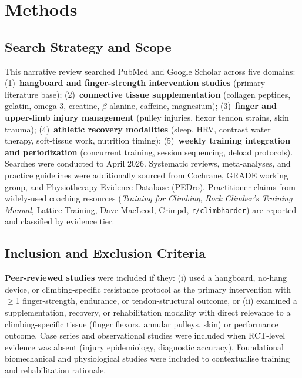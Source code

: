 \section{Methods}

\subsection*{Search Strategy and Scope}

This narrative review searched PubMed and Google Scholar across five domains: (1)~\textbf{hangboard and finger-strength intervention studies} (primary literature base); (2)~\textbf{connective tissue supplementation} (collagen peptides, gelatin, omega-3, creatine, $\beta$-alanine, caffeine, magnesium); (3)~\textbf{finger and upper-limb injury management} (pulley injuries, flexor tendon strains, skin trauma); (4)~\textbf{athletic recovery modalities} (sleep, HRV, contrast water therapy, soft-tissue work, nutrition timing); (5)~\textbf{weekly training integration and periodization} (concurrent training, session sequencing, deload protocols). Searches were conducted to April 2026. Systematic reviews, meta-analyses, and practice guidelines were additionally sourced from Cochrane, GRADE working group, and Physiotherapy Evidence Database (PEDro). Practitioner claims from widely-used coaching resources (\textit{Training for Climbing}, \textit{Rock Climber's Training Manual}, Lattice Training, Dave MacLeod, Crimpd, \texttt{r/climbharder}) are reported and classified by evidence tier.

\subsection*{Inclusion and Exclusion Criteria}

\textbf{Peer-reviewed studies} were included if they: (i) used a hangboard, no-hang device, or climbing-specific resistance protocol as the primary intervention with $\geq$1 finger-strength, endurance, or tendon-structural outcome, or (ii) examined a supplementation, recovery, or rehabilitation modality with direct relevance to a climbing-specific tissue (finger flexors, annular pulleys, skin) or performance outcome. Case series and observational studies were included when RCT-level evidence was absent (injury epidemiology, diagnostic accuracy). Foundational biomechanical and physiological studies were included to contextualise training and rehabilitation rationale.

